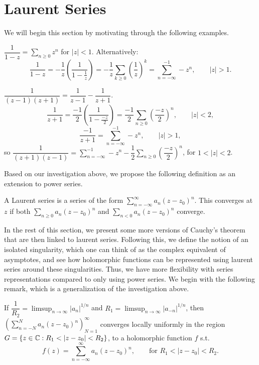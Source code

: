 \documentclass[11pt]{article}
\begin{document}
\newpage
\section{Laurent Series}

We will begin this section by motivating through the following examples.

\begin{example}
$\dfrac{1}{1-z} = \sum_{n\ge0} z^n$ for $|z|<1$. Alternatively:
\[
\frac{1}{1-z} = -\frac1z\left(\frac{1}{1-\frac1z}\right) = -\frac1z\sum_{k\ge0}\left(\frac1z\right)^k = \sum_{n=-\infty}^{-1} -z^n, \qquad |z|>1.
\]
\end{example}

\begin{example}
$\dfrac{1}{(z-1)(z+1)} = \dfrac{1}{z-1}-\dfrac{1}{z+1}$.
\[
\frac{1}{z+1} = \frac{-1}{2}\left(\frac{1}{1-\frac{-z}{2}}\right) = \frac{-1}{2}\sum_{n\ge0}\left(\frac{-z}{2}\right)^n, \qquad |z|<2,
\]
\[
\frac{-1}{z+1} = \sum_{n=-\infty}^{-1} -z^n, \qquad |z|>1,
\]
so $\dfrac{1}{(z+1)(z-1)} = \sum_{n=-\infty}^{-1} -z^n - \dfrac12\sum_{n\ge0}\left(\dfrac{-z}{2}\right)^n$, for $1<|z|<2$.
\end{example}

Based on our investigation above, we propose the following definition as an extension to power series. 

\begin{definition}
A Laurent series is a series of the form $\sum_{n=-\infty}^\infty a_n(z-z_0)^n$. This converges at $z$ if both $\sum_{n\ge0} a_n(z-z_0)^n$ and $\sum_{n<0} a_n(z-z_0)^n$ converge.
\end{definition}

In the rest of this section, we present some more versions of Cauchy's theorem that are then linked to laurent series. Following this, we define the notion of an isolated singularity, which one can think of as the complex equivalent of asymptotes, and see how holomorphic functions can be represented using laurent series around these singularities. Thus, we have more flexibility with series representations compared to only using power series. We begin with the following remark, which is a generalization of the investigation above.

\begin{remark}
    If $\dfrac{1}{R_2} = \limsup_{n\to\infty} |a_n|^{1/n}$ and $R_1 = \limsup_{n\to\infty} |a_{-n}|^{1/n}$, then $\left(\sum_{n=-N}^N a_n(z-z_0)^n\right)_{N=1}^\infty$ converges locally uniformly in the region $G = \{z\in{\mathbb{C}} : R_1 < |z-z_0| < R_2\}$, to a holomorphic function $f$ s.t.
    \[
    f(z) = \sum_{n=-\infty}^\infty a_n(z-z_0)^n, \qquad \text{for } R_1<|z-z_0|<R_2.
    \]
\end{remark}
\end{document}
